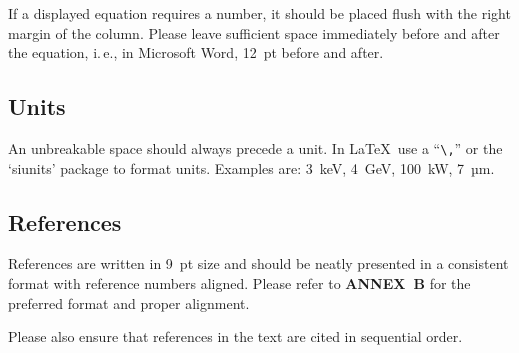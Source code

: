\documentclass[a4paper,
              ]{jacow}
\newcommand\SEC[1]{\textbf{\uppercase{#1}}}
\begin{document}
If a displayed equation requires a number, it should be
placed flush with the right margin of the column. Please
leave sufficient space immediately before and after the
equation, i.\,e., in Microsoft Word, \SI{12}{pt} before and after.

\subsection{Units}

An unbreakable space should always precede a unit. In \LaTeX\ use 
a “\verb|\,|” or the ‘siunits’ package to format units.
Examples are:
\SI{3}{keV}, \SI{4}{GeV}, \SI{100}{kW}, \SI{7}{µm}.

\subsection{References}

References are written in \SI{9}{pt} size and should be neatly
presented in a consistent format with reference numbers
aligned. Please refer to \SEC{Annex~B} for the preferred format
and proper alignment.

Please also ensure that references in the text are cited in
sequential order.
\end{document}
